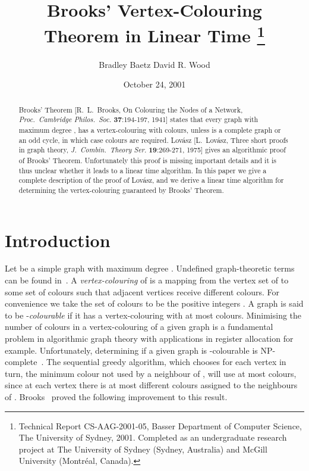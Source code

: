 \documentclass{article}
\begin{document}
\date{October 24, 2001}

\title{\textbf{Brooks' Vertex-Colouring\\ Theorem in Linear Time} \thanks{Technical Report CS-AAG-2001-05, Basser Department of Computer Science, The University of Sydney, 2001. Completed as an undergraduate research project at The University of Sydney (Sydney, Australia)  and McGill University (Montr\'eal, Canada).}}


\author{Bradley Baetz \qquad David R. Wood\footnotemark[2]}



\maketitle

\begin{abstract} Brooks' Theorem  [R.\ L.\ Brooks, On Colouring the Nodes of a
Network, \emph{Proc.\ Cambridge Philos.\ Soc.} \textbf{37}:194-197, 1941]
states that every graph  with maximum degree , has a
vertex-colouring with  colours, unless  is a complete graph or an
odd cycle, in which case  colours are required. Lov{\'a}sz [L.\
Lov{\'a}sz, Three short proofs in graph theory, \emph{J.\ Combin.\ Theory Ser.}
\textbf{19}:269-271, 1975] gives an algorithmic proof of Brooks' Theorem. 
Unfortunately this proof is missing important details and it is thus unclear
whether it leads to a linear time algorithm. In this paper we give a complete
description of the proof of Lov{\'a}sz, and we derive a linear time algorithm
for determining the vertex-colouring guaranteed by Brooks' Theorem. 
\end{abstract}



\section{Introduction}

Let  be a simple graph with maximum degree . Undefined
graph-theoretic terms can be found in~\cite{CL96}. A \emph{vertex-colouring} of
 is a mapping from the vertex set of  to some set of colours such that
adjacent vertices receive different colours. For convenience we take the set of
colours to be the positive integers . A graph is said to be
-\emph{colourable} if it has a vertex-colouring with at most  colours.
Minimising the number of colours in a vertex-colouring of a given graph is a
fundamental problem in algorithmic graph theory with applications in register
allocation for example. Unfortunately, determining if a given graph is
-colourable is NP-complete~\cite{Karp72}. The sequential greedy algorithm,
which chooses for each vertex  in turn, the minimum colour not used by a
neighbour of , will use at most  colours, since at each vertex 
there is at most  different colours assigned to the neighbours of .
Brooks~\cite{Brooks41} proved the following improvement to this result.
\end{document}
